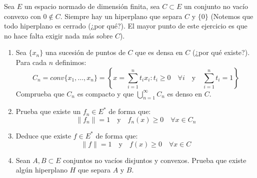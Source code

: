 \begin{ejercicio}%
    Sea $E$ un espacio normado de dimensión finita, sea $C\subset E$ un conjunto no vacío convexo con $0\notin C$. Siempre hay un hiperplano que separa $C$ y $\{0\}$ (Notemos que todo hiperplano es cerrado (¿por qué?). El mayor punto de este ejercicio es que no hace falta exigir nada más sobre $C$).
    \begin{enumerate}[label=\alph*)]
        \item Sea $\{x_n\}$ una sucesión de puntos de $C$ que es densa en $C$ (¿por qué existe?). Para cada $n$ definimos:
            \begin{equation*}
                C_n = conv\{x_1, \ldots, x_n\} = \left\{x=\sum_{i=1}^{n}t_ix_i : t_i\geq 0 \quad \forall i \quad \text{y}\quad \sum_{i=1}^{n}t_i = 1 \right\}
            \end{equation*}
            Comprueba que $C_n$ es compacto y que $\bigcup\limits_{n=1}^\infty C_n$ es denso en $C$.
        \item Prueba que existe un $f_n \in E^\ast$ de forma que:
            \begin{equation*}
                \|f_n\| = 1 \quad \text{y}\quad f_n(x) \geq 0 \quad \forall x\in C_n
            \end{equation*}
        \item Deduce que existe $f\in E^\ast$ de forma que:
            \begin{equation*}
                \|f\| = 1 \quad \text{y}\quad f(x)\geq 0 \quad \forall x\in C
            \end{equation*}
        \item Sean $A,B\subset E$ conjuntos no vacíos disjuntos y convexos. Prueba que existe algún hiperplano $H$ que separa $A$ y $B$.
    \end{enumerate}
\end{ejercicio}

